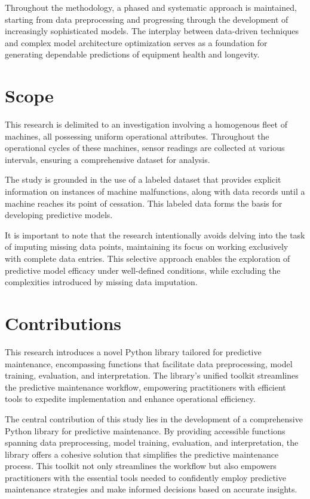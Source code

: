 \documentclass{IEEEtran}
\begin{document}
        Throughout the methodology, a phased and systematic approach is maintained, starting from data preprocessing and progressing through the development of increasingly sophisticated models. The interplay between data-driven techniques and complex model architecture optimization serves as a foundation for generating dependable predictions of equipment health and longevity.

    \section{Scope}

        This research is delimited to an investigation involving a homogenous fleet of machines, all possessing uniform operational attributes. Throughout the operational cycles of these machines, sensor readings are collected at various intervals, ensuring a comprehensive dataset for analysis.

        The study is grounded in the use of a labeled dataset that provides explicit information on instances of machine malfunctions, along with data records until a machine reaches its point of cessation. This labeled data forms the basis for developing predictive models.

        It is important to note that the research intentionally avoids delving into the task of imputing missing data points, maintaining its focus on working exclusively with complete data entries. This selective approach enables the exploration of predictive model efficacy under well-defined conditions, while excluding the complexities introduced by missing data imputation.

    \section{Contributions}

        This research introduces a novel Python library tailored for predictive maintenance, encompassing functions that facilitate data preprocessing, model training, evaluation, and interpretation. The library's unified toolkit streamlines the predictive maintenance workflow, empowering practitioners with efficient tools to expedite implementation and enhance operational efficiency.

        The central contribution of this study lies in the development of a comprehensive Python library for predictive maintenance. By providing accessible functions spanning data preprocessing, model training, evaluation, and interpretation, the library offers a cohesive solution that simplifies the predictive maintenance process. This toolkit not only streamlines the workflow but also empowers practitioners with the essential tools needed to confidently employ predictive maintenance strategies and make informed decisions based on accurate insights.

    
    
\end{document}
